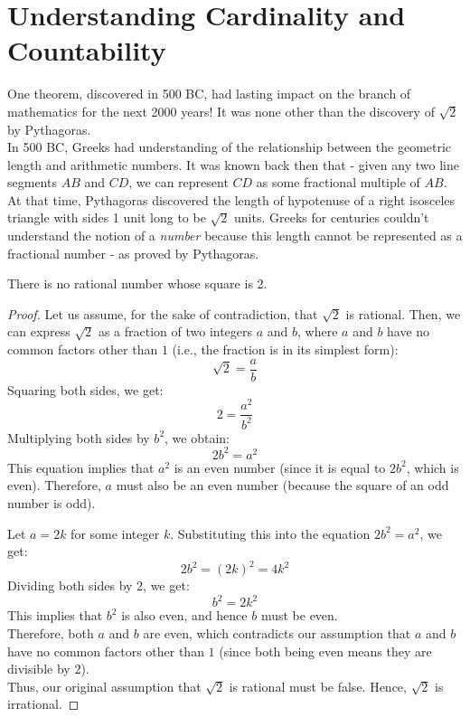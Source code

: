 \section{Understanding Cardinality and Countability}\cite{understandinganalysis}

One theorem, discovered in 500 BC, had lasting impact on the branch of mathematics for the next 2000 years! It was none other than the discovery of $\sqrt{2}$ by Pythagoras. \\

In 500 BC, Greeks had understanding of the relationship between the geometric length and arithmetic numbers. It was known back then that - given any two line segments $AB$ and $CD$, we can represent $CD$ as some fractional multiple of $AB$. At that time, Pythagoras discovered the length of hypotenuse of a right isosceles triangle with sides 1 unit long to be $\sqrt{2}$ units. Greeks for centuries couldn't understand the notion of a \textit{number} because this length cannot be represented as a fractional number - as proved by Pythagoras.

\begin{theorem}
    There is no rational number whose square is 2.
\end{theorem}

\begin{proof}
Let us assume, for the sake of contradiction, that $\sqrt{2}$ is rational. Then, we can express $\sqrt{2}$ as a fraction of two integers $a$ and $b$, where $a$ and $b$ have no common factors other than $1$ (i.e., the fraction is in its simplest form):
\[
\sqrt{2} = \frac{a}{b}
\]
Squaring both sides, we get:
\[
2 = \frac{a^2}{b^2}
\]
Multiplying both sides by $b^2$, we obtain:
\[
2b^2 = a^2
\]
This equation implies that $a^2$ is an even number (since it is equal to $2b^2$, which is even). Therefore, $a$ must also be an even number (because the square of an odd number is odd).

Let $a = 2k$ for some integer $k$. Substituting this into the equation $2b^2 = a^2$, we get:
\[
2b^2 = (2k)^2 = 4k^2
\]
Dividing both sides by $2$, we get:
\[
b^2 = 2k^2
\]
This implies that $b^2$ is also even, and hence $b$ must be even. \\

Therefore, both $a$ and $b$ are even, which contradicts our assumption that $a$ and $b$ have no common factors other than $1$ (since both being even means they are divisible by $2$). \\

Thus, our original assumption that $\sqrt{2}$ is rational must be false. Hence, $\sqrt{2}$ is irrational.
\end{proof}


